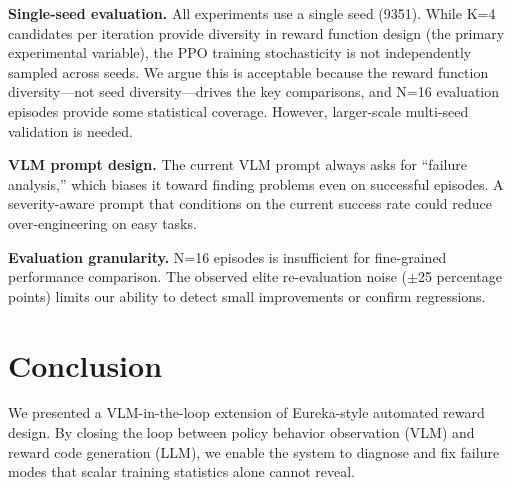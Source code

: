 \documentclass[conference]{IEEEtran}
\begin{document}
\textbf{Single-seed evaluation.}
All experiments use a single seed (9351). While K=4 candidates per iteration
provide diversity in reward function design (the primary experimental variable),
the PPO training stochasticity is not independently sampled across seeds. We
argue this is acceptable because the reward function diversity---not seed
diversity---drives the key comparisons, and N=16 evaluation episodes provide
some statistical coverage. However, larger-scale multi-seed validation is
needed.


\textbf{VLM prompt design.}
The current VLM prompt always asks for ``failure analysis,'' which biases
it toward finding problems even on successful episodes. A severity-aware
prompt that conditions on the current success rate could reduce
over-engineering on easy tasks.

\textbf{Evaluation granularity.}
N=16 episodes is insufficient for fine-grained performance comparison.
The observed elite re-evaluation noise ($\pm$25 percentage points) limits
our ability to detect small improvements or confirm regressions.


\section{Conclusion}

We presented a VLM-in-the-loop extension of Eureka-style automated reward
design. By closing the loop between policy behavior observation (VLM) and reward
code generation (LLM), we enable the system to diagnose and fix failure modes
that scalar training statistics alone cannot reveal.
\end{document}
